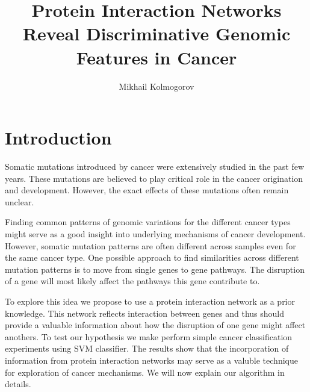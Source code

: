 \documentclass[a4paper]{article}
\begin{document}
\title{Protein Interaction Networks Reveal Discriminative Genomic 
	   Features in Cancer}
\author{Mikhail Kolmogorov}

\maketitle


\section{Introduction}

Somatic mutations introduced by cancer were extensively studied in the past few years.
These mutations are believed to play critical role in the cancer origination and development.
However, the exact effects of these mutations often remain unclear. 

Finding common patterns of genomic variations for the different cancer types
might serve as a good insight into underlying mechanisms of cancer development.
However, somatic mutation patterns are often different across samples
even for the same cancer type.
One possible approach to find similarities across different mutation patterns
is to move from single genes to gene pathways. The disruption of a gene will most 
likely affect the pathways this gene contribute to. 

To explore this idea we propose to use a protein interaction network as
a prior knowledge. This network reflects interaction between genes and thus
should provide a valuable information about how the disruption of one
gene might affect anothers. To test our hypothesis we make perform simple
cancer classification experiments using SVM classifier. The results show that
the incorporation of information from protein interaction networks may
serve as a valuble technique for exploration of cancer mechanisms.
We will now explain our algorithm in details.
\end{document}
